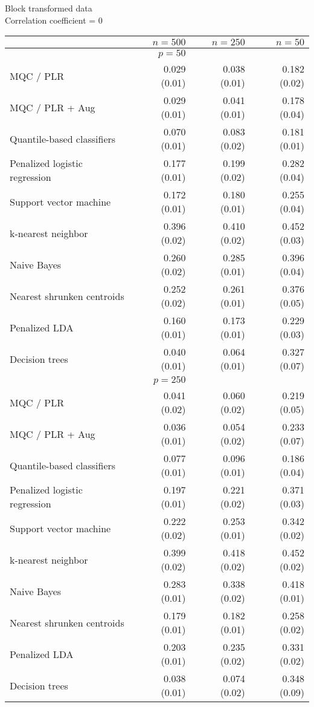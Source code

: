 
\begin{table}[p]
  \centering
  Block transformed data \\
  Correlation coefficient = 0 \\[2ex]
  \begin{adjustbox}{max size={\textwidth}{10cm}}
    \begin{tabular}{l@{\extracolsep{15mm}}rrr}
      
      \hline
      & $n=500$ & $n=250$ & $n=50$ \\ 
      \hline
      & $p = 50$ \\
      \hline

      MQC / PLR & 0.029 (0.01) & 0.038 (0.01) & 0.182 (0.02) \\ 
      MQC / PLR + Aug & 0.029 (0.01) & 0.041 (0.01) & 0.178 (0.04) \\ 
      Quantile-based classifiers & 0.070 (0.01) & 0.083 (0.02) & 0.181 (0.01) \\ 
      Penalized logistic regression & 0.177 (0.01) & 0.199 (0.02) & 0.282 (0.04) \\ 
      Support vector machine & 0.172 (0.01) & 0.180 (0.01) & 0.255 (0.04) \\ 
      k-nearest neighbor & 0.396 (0.02) & 0.410 (0.02) & 0.452 (0.03) \\ 
      Naive Bayes & 0.260 (0.02) & 0.285 (0.01) & 0.396 (0.04) \\ 
      Nearest shrunken centroids & 0.252 (0.02) & 0.261 (0.01) & 0.376 (0.05) \\ 
      Penalized LDA & 0.160 (0.01) & 0.173 (0.01) & 0.229 (0.03) \\ 
      Decision trees & 0.040 (0.01) & 0.064 (0.01) & 0.327 (0.07) \\ [2ex]

      \hline
      & $p = 250$ \\
      \hline

      MQC / PLR & 0.041 (0.02) & 0.060 (0.02) & 0.219 (0.05) \\ 
      MQC / PLR + Aug & 0.036 (0.01) & 0.054 (0.02) & 0.233 (0.07) \\ 
      Quantile-based classifiers & 0.077 (0.01) & 0.096 (0.01) & 0.186 (0.04) \\ 
      Penalized logistic regression & 0.197 (0.01) & 0.221 (0.02) & 0.371 (0.03) \\ 
      Support vector machine & 0.222 (0.02) & 0.253 (0.01) & 0.342 (0.02) \\ 
      k-nearest neighbor & 0.399 (0.02) & 0.418 (0.02) & 0.452 (0.02) \\ 
      Naive Bayes & 0.283 (0.01) & 0.338 (0.02) & 0.418 (0.01) \\ 
      Nearest shrunken centroids & 0.179 (0.01) & 0.182 (0.01) & 0.258 (0.02) \\ 
      Penalized LDA & 0.203 (0.01) & 0.235 (0.02) & 0.331 (0.02) \\ 
      Decision trees & 0.038 (0.01) & 0.074 (0.02) & 0.348 (0.09) \\ [2ex]


\end{tabular}
\end{adjustbox}
\end{table}
